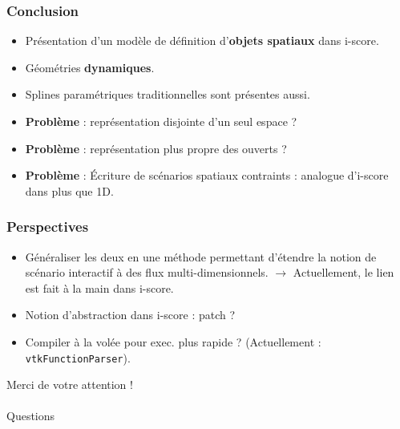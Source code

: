 \documentclass{beamer}
\begin{document}
\begin{frame}
    \frametitle{Conclusion}
    \Large
    \begin{itemize}
        \item Présentation d'un modèle de définition d'\textbf{objets spatiaux} dans i-score.
        \item Géométries \textbf{dynamiques}.
        \item Splines paramétriques traditionnelles sont présentes aussi.
        \item \textbf{Problème} : représentation disjointe d'un seul espace ? 
        \item \textbf{Problème} : représentation plus propre des ouverts ?
        \item \textbf{Problème} : Écriture de scénarios spatiaux contraints : analogue d'i-score dans plus que 1D.
    \end{itemize}
\end{frame}
\begin{frame}
    \frametitle{Perspectives}
    \Large
    \begin{itemize}
        \item Généraliser les deux en une méthode permettant d'étendre la notion de scénario interactif à des flux multi-dimensionnels.
        $\rightarrow$ Actuellement, le lien est fait à la main dans i-score.
        \item Notion d'abstraction dans i-score : patch ?
        \item Compiler à la volée pour exec. plus rapide ? (Actuellement : \texttt{vtkFunctionParser}).
    \end{itemize}
\end{frame}


\begin{frame}
    \large{}
    \centering
    Merci de votre attention !~\\
    
    \Huge{}~\\
    Questions
\end{frame}
\end{document}
